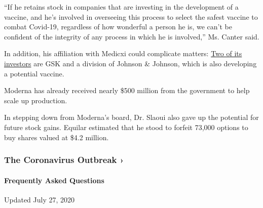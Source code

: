 ``If he retains stock in companies that are investing in the development
of a vaccine, and he's involved in overseeing this process to select the
safest vaccine to combat Covid-19, regardless of how wonderful a person
he is, we can't be confident of the integrity of any process in which he
is involved,'' Ms. Canter said.

In addition, his affiliation with Medicxi could complicate matters:
\href{https://www.medicxi.com/sections/about}{Two of its investors} are
GSK and a division of Johnson \& Johnson, which is also developing a
potential vaccine.

Moderna has already received nearly \$500 million from the government to
help scale up production.

In stepping down from Moderna's board, Dr. Slaoui also gave up the
potential for future stock gains. Equilar estimated that he stood to
forfeit 73,000 options to buy shares valued at \$4.2 million.

\href{https://www.nytimes3xbfgragh.onion/news-event/coronavirus?action=click\&pgtype=Article\&state=default\&region=MAIN_CONTENT_3\&context=storylines_faq}{}

\hypertarget{the-coronavirus-outbreak-}{%
\subsubsection{The Coronavirus Outbreak
›}\label{the-coronavirus-outbreak-}}

\hypertarget{frequently-asked-questions}{%
\paragraph{Frequently Asked
Questions}\label{frequently-asked-questions}}

Updated July 27, 2020

